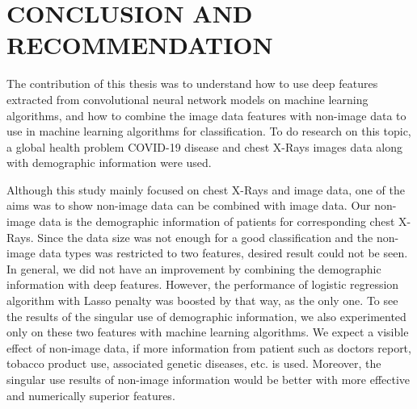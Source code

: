 \chapter{CONCLUSION AND RECOMMENDATION}
\label{ch:CH7}

The contribution of this thesis was to understand how to use deep features extracted from convolutional neural network models on machine learning algorithms, and how to combine the image data features with non-image data to use in machine learning algorithms for classification. To do research on this topic, a global health problem COVID-19 disease and chest X-Rays images data along with demographic information were used.

\begin{comment}
The main scope of this thesis was to show an approach on how to use image data without segmenting or manually extracting features to embed them into machine learning algorithms, and afterwards to apply it on a continuing global public health problem.
\end{comment}

Although this study mainly focused on chest X-Rays and image data, one of the aims was to show non-image data can be combined with image data. Our non-image data is the demographic information of patients for corresponding chest X-Rays. Since the data size was not enough for a good classification and the non-image data types was restricted to two features, desired result could not be seen. In general, we did not have an improvement by combining the demographic information with deep features. However, the performance of logistic regression algorithm with Lasso penalty was boosted by that way, as the only one. To see the results of the singular use of demographic information, we also experimented only on these two features with machine learning algorithms. We expect a visible effect of non-image data, if more information from patient such as doctors report, tobacco product use, associated genetic diseases, etc. is used. Moreover, the singular use results of non-image information would be better with more effective and numerically superior features.

